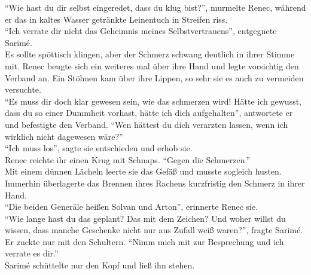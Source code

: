 ``Wie hast du dir selbst eingeredet, dass du klug bist?'', murmelte Renec, während er das in kaltes 
Wasser getränkte Leinentuch in Streifen riss.\\
``Ich verrate dir nicht das Geheimnis meines Selbstvertrauens'', entgegnete Sarimé.\\
Es sollte spöttisch klingen, aber der Schmerz schwang deutlich in ihrer Stimme mit. Renec beugte 
sich ein weiteres mal über ihre Hand und legte vorsichtig den Verband an. Ein Stöhnen kam über ihre 
Lippen, so sehr sie es auch zu vermeiden versuchte.\\
``Es muss dir doch klar gewesen sein, wie das schmerzen wird!  Hätte ich gewusst, dass du so 
einer Dummheit vorhast, hätte ich dich aufgehalten'', antwortete er und befestigte den Verband. 
``Wen hättest du dich verarzten lassen, wenn ich wirklich nicht dagewesen wäre?''\\
``Ich muss los'', sagte sie entschieden und erhob sie.\\
Renec reichte ihr einen Krug mit Schnaps. ``Gegen die Schmerzen.''\\
Mit einem dünnen Lächeln leerte sie das Gefäß und musste sogleich husten. Immerhin überlagerte das 
Brennen ihres Rachens kurzfristig den Schmerz in ihrer Hand.\\
``Die beiden Generäle heißen Solvan und Arton'', erinnerte Renec sie.\\
``Wie lange hast du das geplant? Das mit dem Zeichen? Und woher willst du wissen, dass manche 
Geschenke nicht nur aus Zufall weiß waren?'', fragte Sarimé.\\
Er zuckte nur mit den Schultern. ``Nimm mich mit zur Besprechung und ich verrate es dir.''\\
Sarimé schüttelte nur den Kopf und ließ ihn stehen.\\

